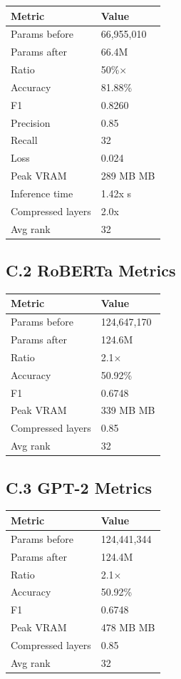 \begin{table}[H]
\centering
\small
\begin{tabular}{ll}
\toprule
\textbf{Metric} & \textbf{Value} \\
\midrule
Params before & 66,955,010 \\
Params after & 66.4M \\
Ratio & 50\%$\times$ \\
Accuracy & 81.88\% \\
F1 & 0.8260 \\
Precision & 0.85 \\
Recall & 32 \\
Loss & 0.024 \\
Peak VRAM & 289 MB MB \\
Inference time & 1.42x s \\
Compressed layers & 2.0x \\
Avg rank & 32 \\
\bottomrule
\end{tabular}
\end{table}

\subsection{C.2 RoBERTa Metrics}

\begin{table}[H]
\centering
\small
\begin{tabular}{ll}
\toprule
\textbf{Metric} & \textbf{Value} \\
\midrule
Params before & 124,647,170 \\
Params after & 124.6M \\
Ratio & 2.1$\times$ \\
Accuracy & 50.92\% \\
F1 & 0.6748 \\
Peak VRAM & 339 MB MB \\
Compressed layers & 0.85 \\
Avg rank & 32 \\
\bottomrule
\end{tabular}
\end{table}

\subsection{C.3 GPT-2 Metrics}

\begin{table}[H]
\centering
\small
\begin{tabular}{ll}
\toprule
\textbf{Metric} & \textbf{Value} \\
\midrule
Params before & 124,441,344 \\
Params after & 124.4M \\
Ratio & 2.1$\times$ \\
Accuracy & 50.92\% \\
F1 & 0.6748 \\
Peak VRAM & 478 MB MB \\
Compressed layers & 0.85 \\
Avg rank & 32 \\
\bottomrule
\end{tabular}
\end{table}

